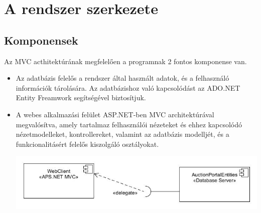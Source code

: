 \documentclass[12pt,a4paper]{article}
\begin{document}
\section{A rendszer szerkezete}
\subsection{Komponensek}
Az MVC acthitektúrának megfelelően a programnak 2 fontos komponense van.
\begin{itemize}
\item Az adatbázis felelős a rendszer által használt adatok, és a felhasználó információk tárolására. Az adatbázishoz való kapcsolódást az ADO.NET Entity Freamwork segítségével biztosítjuk.
\item A webes alkalmazási felület ASP.NET-ben MVC architektúrával megvalósítva, amely tartalmaz felhasználói nézeteket és ehhez kapcsolódó nézetmodelleket, kontrollereket, valamint az adatbázis modelljét, és a funkcionalitásért felelős kiszolgáló osztályokat.

\includegraphics[scale=0.5]{komponens_diagram.jpg}

\end{itemize}
\end{document}
